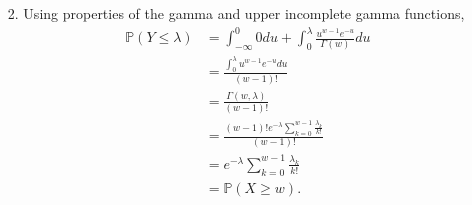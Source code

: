 \documentclass[a4paper,12pt]{article}
\begin{document}
\begin{enumerate}
    \item[2.] 
        Using properties of the gamma and upper incomplete gamma functions,
        \begin{align*}
            \mathbb{P}(Y \leq \lambda) &= \int_{-\infty}^0 0 du + \int_{0}^\lambda \frac{u^{w - 1} e^{-u}}{\Gamma(w)} du \\
            &= \frac{\int_0^\lambda u^{w - 1} e^{-u} du}{(w - 1)!} \\
            &= \frac{\Gamma(w, \lambda)}{(w - 1)!} \\
            &= \frac{(w - 1)! e^{-\lambda} \sum_{k = 0}^{w - 1} \frac{\lambda_k}{k!}}{(w - 1)!} \\
            &= e^{-\lambda} \sum_{k = 0}^{w - 1} \frac{\lambda_k}{k!} \\
            &= \mathbb{P}(X \geq w).
        \end{align*}


\end{enumerate}
\end{document}
